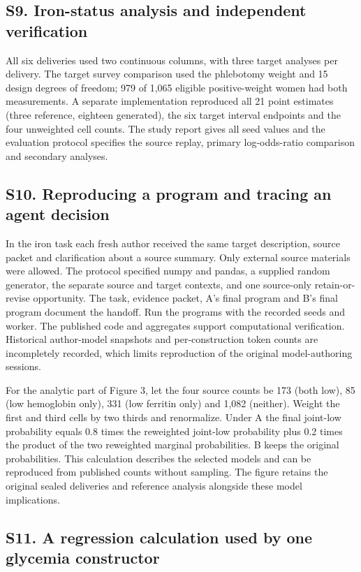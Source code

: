 \documentclass[sigconf,review]{acmart}
\begin{document}
\subsection*{S9. Iron-status analysis and independent verification}

All six deliveries used two continuous columns, with three target analyses per delivery. The target survey comparison used the phlebotomy weight and 15 design degrees of freedom; 979 of 1,065 eligible positive-weight women had both measurements. A separate implementation reproduced all 21 point estimates (three reference, eighteen generated), the six target interval endpoints and the four unweighted cell counts. The study report gives all seed values and the evaluation protocol specifies the source replay, primary log-odds-ratio comparison and secondary analyses.


\subsection*{S10. Reproducing a program and tracing an agent decision}

In the iron task each fresh author received the same target description, source packet and clarification about a source summary. Only external source materials were allowed. The protocol specified numpy and pandas, a supplied random generator, the separate source and target contexts, and one source-only retain-or-revise opportunity. The task, evidence packet, A's final program and B's final program document the handoff. Run the programs with the recorded seeds and worker. The published code and aggregates support computational verification. Historical author-model snapshots and per-construction token counts are incompletely recorded, which limits reproduction of the original model-authoring sessions.


For the analytic part of Figure 3, let the four source counts be 173 (both low), 85 (low hemoglobin only), 331 (low ferritin only) and 1,082 (neither). Weight the first and third cells by two thirds and renormalize. Under A the final joint-low probability equals 0.8 times the reweighted joint-low probability plus 0.2 times the product of the two reweighted marginal probabilities. B keeps the original probabilities. This calculation describes the selected models and can be reproduced from published counts without sampling. The figure retains the original sealed deliveries and reference analysis alongside these model implications.


\subsection*{S11. A regression calculation used by one glycemia constructor}
\end{document}
